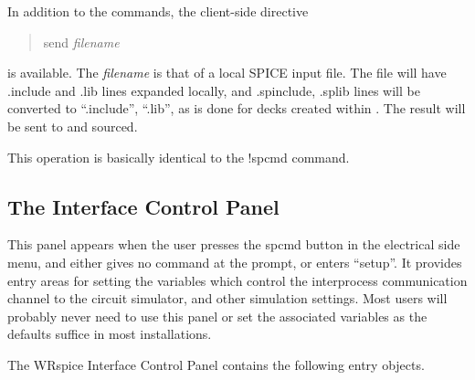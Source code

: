 In addition to the {\WRspice} commands, the client-side directive
\begin{quote}
{\vt send} {\it filename}
\end{quote}
is available.  The {\it filename} is that of a local SPICE input file. 
The file will have {\vt .include} and {\vt .lib} lines expanded
locally, and {\vt .spinclude}, {\vt .splib} lines will be converted to
``{\vt .include}'', ``{\vt .lib}'', as is done for decks created within
{\Xic}.  The result will be sent to {\WRspice} and sourced.

This operation is basically identical to the {\cb !spcmd} command.

\subsection{The {\WRspice} Interface Control Panel}

This panel appears when the user presses the {\cb spcmd} button in the
electrical side menu, and either gives no command at the prompt, or
enters ``{\vt setup}''.  It provides entry areas for setting the
variables which control the interprocess communication channel to the
{\WRspice} circuit simulator, and other simulation settings.  Most
users will probably never need to use this panel or set the associated
variables as the defaults suffice in most installations.

The {\cb WRspice Interface Control Panel} contains the following entry
objects.

